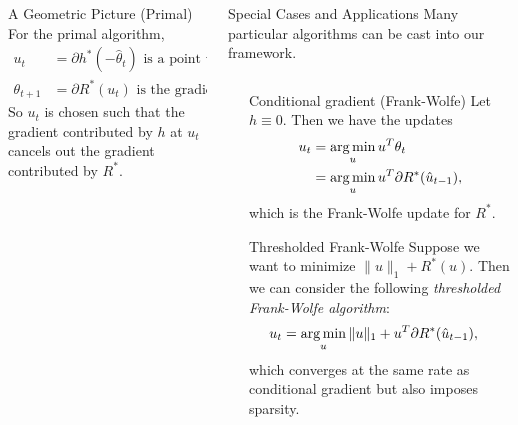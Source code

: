 \documentclass[final]{beamer}
\begin{document}
\begin{frame}{}
\begin{columns}
\begin{column}{0.46\linewidth}
\begin{columns}[t]
\begin{column}{.53\linewidth}
\begin{block}{\large A Geometric Picture (Primal)}
For the primal algorithm,
\begin{align*}
u_t\,\,\,\,\,\, &= \partial h^{*}(-\hat\theta_{t}) \text{ is a point where $-\hat\theta_{t} \in \partial h$} \\ 
\theta_{t+1}    &= \partial R^{*}(u_{t}) \text{ is the gradient of $R^{*}$ at $u_{t}$}
\end{align*}
So $u_{t}$ is chosen such that the gradient contributed by $h$ at $u_{t}$ cancels out the gradient contributed by $R^{*}$. 
\end{block}
\end{column}
\end{columns}
\end{column}	

	

\begin{column}{0.50\linewidth}

\begin{block}{\large Special Cases and Applications}
Many particular algorithms can be cast into our framework.
\begin{columns}[t]
\begin{column}{0.01\linewidth}\end{column}
\begin{column}{0.47\linewidth}

\begin{block}{Conditional gradient (Frank-Wolfe)}
Let $h \equiv 0$. Then we have the updates
\begin{align*}
u_t &= \argmin_u u^T\theta_t \\
 &= \argmin_u u^T\partial R^*(\hat{u}_{t-1}),
\end{align*}
which is the Frank-Wolfe update for $R^*$.
\end{block}

\begin{block}{Thresholded Frank-Wolfe}
Suppose we want to minimize $\|u\|_1 + R^*(u)$. Then 
we can consider the following 
\emph{thresholded Frank-Wolfe algorithm}:
\begin{align*}
u_t &= \argmin_u \|u\|_1 + u^T\partial R^*(\hat{u}_{t-1}),
\end{align*}
which converges at the same rate as conditional gradient 
but also imposes sparsity.
\end{block}


\end{column}
\end{columns}
\end{block}
\end{column}
\end{columns}
\end{frame}
\end{document}
